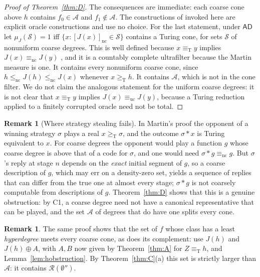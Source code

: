 \documentclass[11pt,letterpaper]{article}
\theoremstyle{definition}
\newtheorem{remark}[definition]{Remark}
\numberwithin{equation}{section}
\newcommand{\geT}{\ge_{\mathrm T}}
\newcommand{\eqT}{\equiv_{\mathrm T}}
\newcommand{\lenc}{\le_{\mathrm{nc}}}
\newcommand{\eqnc}{\equiv_{\mathrm{nc}}}
\newcommand{\equc}{\equiv_{\mathrm{uc}}}
\newcommand{\nc}{\mathrm{nc}}
\newcommand{\J}{J}
\newcommand{\Rc}{\mathcal R}
\begin{document}
\begin{proof}[Proof of Theorem~\ref{thm:D}]
The consequences are immediate: each coarse cone above $h$ contains $f_0\in\mathcal A$ and $f_1\notin\mathcal A$. The constructions of \cite{Synthesis} invoked here are explicit oracle constructions and use no choice. For the last statement, under $\mathsf{AD}$ let $\mu_\J(\mathcal S)=1$ iff $\{x:[\J(x)]_{\nc}\in\mathcal S\}$ contains a Turing cone, for sets $\mathcal S$ of nonuniform coarse degrees. This is well defined because $x\eqT y$ implies $\J(x)\eqnc\J(y)$ \cite[Proposition~3.5]{Synthesis}, and it is a countably complete ultrafilter because the Martin measure is one. It contains every nonuniform coarse cone, since $h\lenc\J(h)\lenc\J(x)$ whenever $x\geT h$. It contains $\mathcal A$, which is not in the cone filter. We do not claim the analogous statement for the uniform coarse degrees: it is not clear that $x\eqT y$ implies $\J(x)\equc\J(y)$, because a Turing reduction applied to a finitely corrupted oracle need not be total.
\end{proof}

\begin{remark}[Where strategy stealing fails]\label{rem:stealing}
In Martin's proof the opponent of a winning strategy $\sigma$ plays a real $x\geT\sigma$, and the outcome $\sigma*x$ is Turing equivalent to $x$. For coarse degrees the opponent would play a function $g$ whose coarse degree is above that of a code for $\sigma$, and one would need $\sigma*g\eqnc g$. But $\sigma$'s reply at stage $n$ depends on the \emph{exact} initial segment of $g$, so a coarse description of $g$, which may err on a density-zero set, yields a sequence of replies that can differ from the true one at almost every stage; $\sigma*g$ is not coarsely computable from descriptions of $g$. Theorem~\ref{thm:D} shows that this is a genuine obstruction: by C1, a coarse degree need not have a canonical representative that can be played, and the set $\mathcal A$ of degrees that do have one splits every cone.
\end{remark}

\begin{remark}
The same proof shows that the set of $f$ whose class has a least \emph{hyperdegree} meets every coarse cone, as does its complement: use $\J(h)$ and $\J(h)\oplus A$, with $A,B$ now given by Theorem~\ref{thm:A} for $Z\eqT h$, and Lemma~\ref{lem:hobstruction}. By Theorem~\ref{thm:C}(a) this set is strictly larger than $\mathcal A$: it contains $\Rc(\emptyset'')$.
\end{remark}
\end{document}
